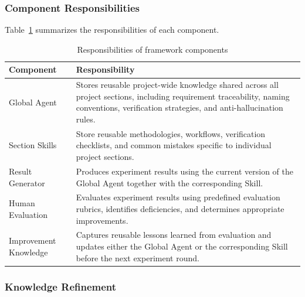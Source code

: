 \subsubsection{Component Responsibilities}

Table~\ref{tab:components} summarizes the responsibilities of each component.

\begin{table}[H]
\centering
\renewcommand{\arraystretch}{1.35}
\caption{Responsibilities of framework components}
\label{tab:components}

\begin{tabularx}{\linewidth}{|>{\raggedright\arraybackslash}p{3.5cm}|X|}
\hline

\textbf{Component}
&
\textbf{Responsibility}
\\
\hline

Global Agent
&
Stores reusable project-wide knowledge shared across all project sections, including requirement traceability, naming conventions, verification strategies, and anti-hallucination rules.
\\
\hline

Section Skills
&
Store reusable methodologies, workflows, verification checklists, and common mistakes specific to individual project sections.
\\
\hline

Result Generator
&
Produces experiment results using the current version of the Global Agent together with the corresponding Skill.
\\
\hline

Human Evaluation
&
Evaluates experiment results using predefined evaluation rubrics, identifies deficiencies, and determines appropriate improvements.
\\
\hline

Improvement Knowledge
&
Captures reusable lessons learned from evaluation and updates either the Global Agent or the corresponding Skill before the next experiment round.
\\
\hline

\end{tabularx}

\end{table}

\subsubsection{Knowledge Refinement}

